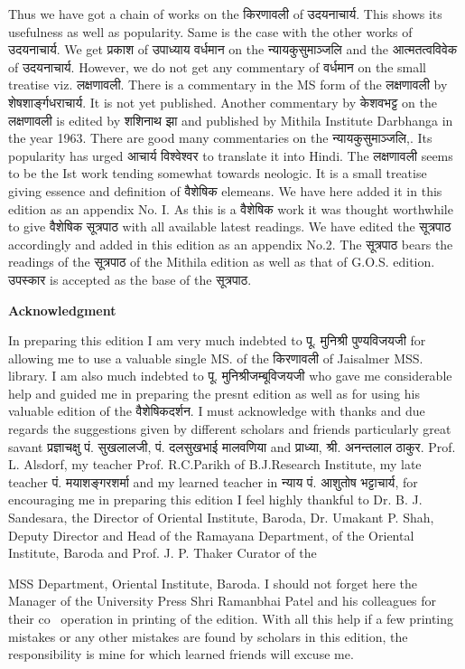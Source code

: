 \documentclass[11pt, openany]{book}
\begin{document}
\newpage
Thus we have got a chain of works on the किरणावली of उदयनाचार्य. This shows its usefulness as well as popularity. Same is the case with the other works of उदयनाचार्य. We get प्रकाश of उपाध्याय वर्धमान on the न्यायकुसुमाञ्जलि and the आत्मतत्वविवेक of उदयनाचार्य. However, we do not get any commentary of वर्धमान on the small treatise viz. लक्षणावली. There is a commentary in the MS form of the लक्षणावली by शेषशार्ङ्गधराचार्य. It is not yet published. Another commentary by केशवभट्ट on the लक्षणावली is edited by शशिनाथ झा and published by Mithila Institute Darbhanga in the year 1963. There are good many commentaries on the न्यायकुसुमाञ्जलि,. Its popularity has urged आचार्य विश्वेश्वर to translate it into Hindi. The लक्षणावली seems to be the Ist work tending somewhat towards neologic. It is a small treatise giving essence and definition of वैशेषिक elemeans. We have here added it in this edition as an appendix No. I. As this is a वैशेषिक work it was thought worthwhile to give वैशेषिक सूत्रपाठ with all available latest readings. We have edited the सूत्रपाठ accordingly and added in this edition as an appendix No.2. The सूत्रपाठ bears the readings of the सूत्रपाठ of the Mithila edition as well as that of G.O.S. edition. उपस्कार is accepted as the base of the सूत्रपाठ.

\noindent
\textbf{Acknowledgment}

In preparing this edition I am very much indebted to पू. मुनिश्री पुण्यविजयजी for allowing me to use a valuable single MS. of the किरणावली of Jaisalmer MSS. library. I am also much indebted to पू. मुनिश्रीजम्बूविजयजी who gave me considerable help and guided me in preparing the presnt edition as well as for using his valuable edition of the वैशेषिकदर्शन. I must acknowledge with thanks and due regards the suggestions given by different scholars and friends particularly great savant प्रज्ञाचक्षु पं. सुखलालजी, पं. दलसुखभाई मालवणिया and प्राध्या, श्री. अनन्तलाल ठाकुर. Prof. L. Alsdorf, my teacher Prof. R.C.Parikh of B.J.Research Institute, my late teacher पं. मयाशङ्गरशर्मा and my learned teacher in न्याय पं. आशुतोष भट्टाचार्य, for encouraging me in preparing this edition I feel highly thankful to Dr. B. J. Sandesara, the Director of Oriental Institute, Baroda, Dr. Umakant P. Shah, Deputy Director and Head of the Ramayana Department, of the Oriental Institute, Baroda and Prof. J. P. Thaker Curator of the

\newpage
\noindent
MSS Department, Oriental Institute, Baroda. I should not forget here the Manager of the University Press Shri Ramanbhai Patel and his colleagues for their co \textendash\ operation in printing of the edition. With all this help if a few printing mistakes or any other mistakes are found by scholars in this edition, the responsibility is mine for which learned friends will excuse me.
\end{document}
